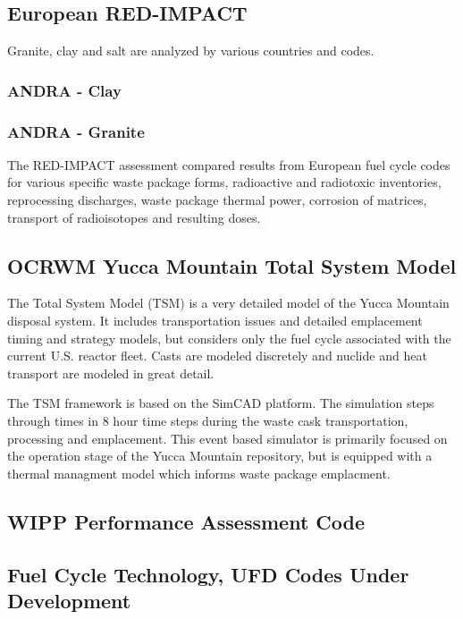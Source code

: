 \subsection{European RED-IMPACT} Granite, clay and salt are analyzed by various
countries and codes.

\subsubsection{ANDRA - Clay}

\subsubsection{ANDRA - Granite}


The RED-IMPACT assessment compared
results from European fuel cycle codes for various specific waste package
forms, radioactive and radiotoxic inventories, reprocessing discharges,  waste
package thermal power, corrosion of matrices, transport of radioisotopes and
resulting doses.


\subsection{OCRWM Yucca Mountain Total System Model} The Total System Model
(TSM) is a very detailed model of the Yucca Mountain disposal system. It
includes transportation issues and detailed emplacement timing and strategy
models, but considers only the fuel cycle associated with the current  U.S.
reactor fleet. Casts are modeled discretely and nuclide and heat transport are
modeled in great detail.\cite{turner_discrete_2010} 

The TSM framework is based on the SimCAD platform. The simulation steps through
times in 8 hour time steps during the waste cask transportation, processing and
emplacement. This event based simulator is primarily focused on the operation
stage of the Yucca Mountain repository, but is equipped with a thermal
managment model which informs waste package emplacment.

\subsection{WIPP Performance Assessment Code}

\subsection{Fuel Cycle Technology, UFD Codes Under Development}

